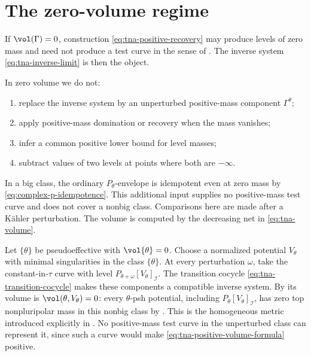 \section{The zero-volume regime}
\label{sec:tna-zero-volume}

If $\vol(\Gamma)=0$, construction
\eqref{eq:tna-positive-recovery} may produce levels of zero mass and need
not produce a test curve in the sense of
.  The inverse system
\eqref{eq:tna-inverse-limit} is then the object.

\begin{remark}
\label{rem:tna-zero-volume-firewall}
In zero volume we do not:
\begin{enumerate}
\item replace the inverse system by an unperturbed positive-mass
      component $\Gamma^{\theta}$;
\item apply positive-mass domination or recovery when the mass vanishes;
\item infer a common positive lower bound for level masses;
\item subtract values of two levels at points where both are
      $-\infty$.
\end{enumerate}
In a big class, the ordinary $P_\theta$-envelope is idempotent even at
zero mass by \eqref{eq:complex-p-idempotence}. This additional input
supplies no positive-mass test curve and does not cover a nonbig class.
Comparisons here are made after a K\"ahler perturbation. The volume is
computed by the decreasing net in \eqref{eq:tna-volume}.
\end{remark}

\begin{example}
\label{ex:tna-boundary-class}
Let $\{\theta\}$ be pseudoeffective with $\vol\{\theta\}=0$.
Choose a normalized potential $V_\theta$ with minimal singularities in the
class $\{\theta\}$.  At every perturbation $\omega$, take the
constant-in-$\tau$ curve with level
$P_{\theta+\omega}[V_\theta]_{\mathcal I}$.  The transition cocycle
\eqref{eq:tna-transition-cocycle} makes these components a compatible
inverse system.  By  its volume is
$\vol(\theta,V_\theta)=0$: every $\theta$-psh potential, including
$P_\theta[V_\theta]_{\mathcal I}$, has zero top nonpluripolar mass in
this nonbig class by .
This is the
homogeneous metric introduced explicitly in .
No positive-mass test curve in the unperturbed class can represent it,
since such a curve would make \eqref{eq:tna-positive-volume-formula}
positive.
\end{example}

